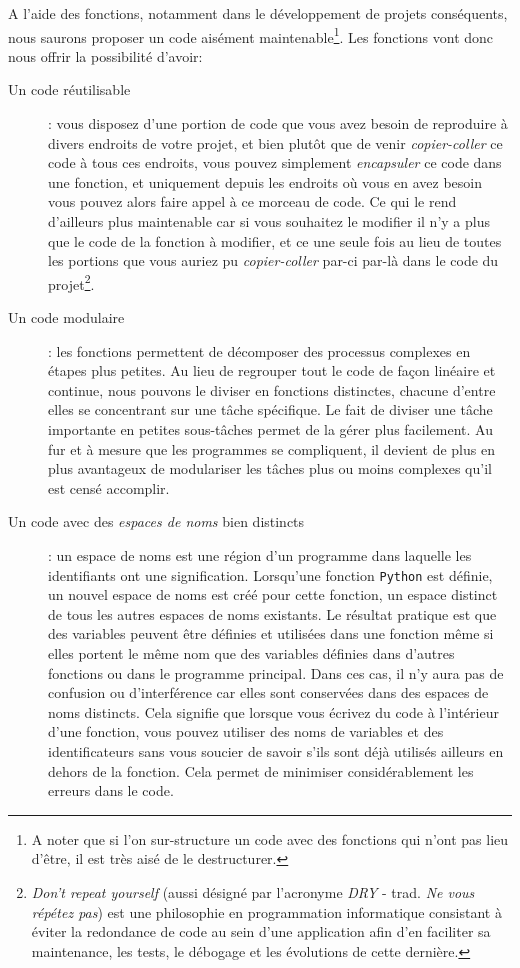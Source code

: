 \documentclass[a4paper,12pt]{book}
\begin{document}
A l'aide des fonctions, notamment dans le développement de projets conséquents, nous saurons proposer un code aisément maintenable\footnote{A noter que si l'on sur-structure un code avec des fonctions qui n'ont pas lieu d'être, il est très aisé de le destructurer.}. Les fonctions vont donc nous offrir la possibilité d'avoir:
\begin{description}
	\item[Un code réutilisable]: vous disposez d'une portion de code que vous avez besoin de reproduire à divers endroits de votre projet, et bien plutôt que de venir \textit{copier-coller} ce code à tous ces endroits, vous pouvez simplement \textit{encapsuler} ce code dans une fonction, et uniquement depuis les endroits où vous en avez besoin vous pouvez alors faire appel à ce morceau de code. Ce qui le rend d'ailleurs plus maintenable car si vous souhaitez le modifier il n'y a plus que le code de la fonction à modifier, et ce une seule fois au lieu de toutes les portions que vous auriez pu \textit{copier-coller} par-ci par-là dans le code du projet\footnote{\og \textit{Don't repeat yourself}\fg{} (aussi désigné par l’acronyme \textit{DRY} - trad. \og \textit{Ne vous répétez pas}\fg{}) est une philosophie en programmation informatique consistant à éviter la redondance de code au sein d’une application afin d'en faciliter sa maintenance, les tests, le débogage et les évolutions de cette dernière.}.
	\item[Un code modulaire]: les fonctions permettent de décomposer des processus complexes en étapes plus petites. Au lieu de regrouper tout le code de façon linéaire et continue, nous pouvons le diviser en fonctions distinctes, chacune d'entre elles se concentrant sur une tâche spécifique. Le fait de diviser une tâche importante en petites sous-tâches permet de la gérer plus facilement. Au fur et à mesure que les programmes se compliquent, il devient de plus en plus avantageux de  modulariser les tâches plus ou moins complexes qu'il est censé accomplir.
	\item[Un code avec des \textit{espaces de noms} bien distincts]: un espace de noms est une région d'un programme dans laquelle les identifiants ont une signification. Lorsqu'une fonction \texttt{Python} est définie, un nouvel espace de noms est créé pour cette fonction, un espace distinct de tous les autres espaces de noms existants. Le résultat pratique est que des variables peuvent être définies et utilisées dans une fonction même si elles portent le même nom que des variables définies dans d'autres fonctions ou dans le programme principal. Dans ces cas, il n'y aura pas de confusion ou d'interférence car elles sont conservées dans des espaces de noms distincts. Cela signifie que lorsque vous écrivez du code à l'intérieur d'une fonction, vous pouvez utiliser des noms de variables et des identificateurs sans vous soucier de savoir s'ils sont déjà utilisés ailleurs en dehors de la fonction. Cela permet de minimiser considérablement les erreurs dans le code.
\end{description}
\medskip
\end{document}
